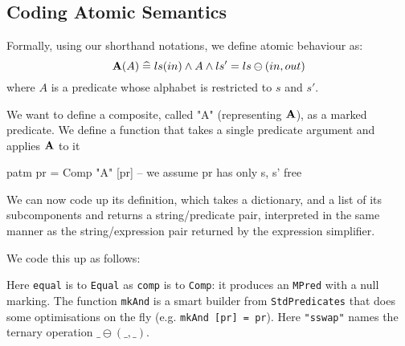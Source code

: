 \subsection{Coding Atomic Semantics}

Formally, using our shorthand notations, we define atomic behaviour as:
\[
    \mathbf{A}(A) \mathrel{\widehat=} ls(in) \land A \land ls'=ls\ominus(in,out)
\]
where $A$ is a predicate whose alphabet is restricted to $s$ and $s'$.

We want to define a composite, called "A" (representing $\mathbf{A}$),
as a marked predicate.
We  define a function that takes a single predicate argument
and applies $\mathbf{A}$ to it
\begin{code}
patm pr = Comp "A" [pr] -- we assume pr has only s, s' free
\end{code}
We can now code up its definition,
which takes a dictionary, and a list of its subcomponents
and returns a string/predicate pair,
interpreted in the same manner as the string/expression pair
returned by the expression simplifier.

We code this up as follows:
Here \texttt{equal} is to \texttt{Equal} as \texttt{comp} is to \texttt{Comp}:
it produces an \texttt{MPred} with a null marking.
The function \texttt{mkAnd} is a smart builder from \texttt{StdPredicates}
that does some optimisations on the fly (e.g. \verb$mkAnd [pr] = pr$).
Here \texttt{"sswap"} names the ternary operation $\_\ominus(\_,\_)$.


